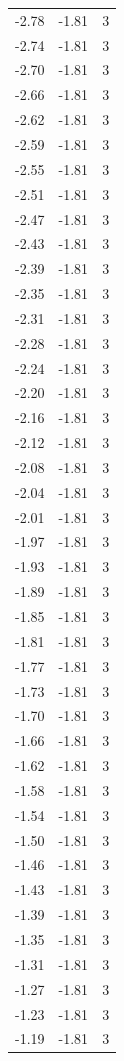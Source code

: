 \begin{longtable}{lrr}
  -2.78 & -1.81 & 3 \\
  -2.74 & -1.81 & 3 \\
  -2.70 & -1.81 & 3 \\
  -2.66 & -1.81 & 3 \\
  -2.62 & -1.81 & 3 \\
  -2.59 & -1.81 & 3 \\
  -2.55 & -1.81 & 3 \\
  -2.51 & -1.81 & 3 \\
  -2.47 & -1.81 & 3 \\
  -2.43 & -1.81 & 3 \\
  -2.39 & -1.81 & 3 \\
  -2.35 & -1.81 & 3 \\
  -2.31 & -1.81 & 3 \\
  -2.28 & -1.81 & 3 \\
  -2.24 & -1.81 & 3 \\
  -2.20 & -1.81 & 3 \\
  -2.16 & -1.81 & 3 \\
  -2.12 & -1.81 & 3 \\
  -2.08 & -1.81 & 3 \\
  -2.04 & -1.81 & 3 \\
  -2.01 & -1.81 & 3 \\
  -1.97 & -1.81 & 3 \\
  -1.93 & -1.81 & 3 \\
  -1.89 & -1.81 & 3 \\
  -1.85 & -1.81 & 3 \\
  -1.81 & -1.81 & 3 \\
  -1.77 & -1.81 & 3 \\
  -1.73 & -1.81 & 3 \\
  -1.70 & -1.81 & 3 \\
  -1.66 & -1.81 & 3 \\
  -1.62 & -1.81 & 3 \\
  -1.58 & -1.81 & 3 \\
  -1.54 & -1.81 & 3 \\
  -1.50 & -1.81 & 3 \\
  -1.46 & -1.81 & 3 \\
  -1.43 & -1.81 & 3 \\
  -1.39 & -1.81 & 3 \\
  -1.35 & -1.81 & 3 \\
  -1.31 & -1.81 & 3 \\
  -1.27 & -1.81 & 3 \\
  -1.23 & -1.81 & 3 \\
  -1.19 & -1.81 & 3 \\

\end{longtable}

